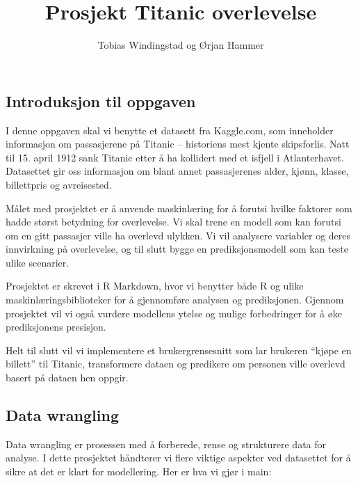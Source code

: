 \documentclass[
]{article}
\title{Prosjekt Titanic overlevelse}
\author{Tobias Windingstad og Ørjan Hammer}
\date{}
\begin{document}
\maketitle

\subsection{Introduksjon til oppgaven}\label{introduksjon-til-oppgaven}

I denne oppgaven skal vi benytte et datasett fra Kaggle.com, som
inneholder informasjon om passasjerene på Titanic -- historiens mest
kjente skipsforlis. Natt til 15. april 1912 sank Titanic etter å ha
kollidert med et isfjell i Atlanterhavet. Datasettet gir oss informasjon
om blant annet passasjerenes alder, kjønn, klasse, billettpris og
avreisested.

Målet med prosjektet er å anvende maskinlæring for å forutsi hvilke
faktorer som hadde størst betydning for overlevelse. Vi skal trene en
modell som kan forutsi om en gitt passasjer ville ha overlevd ulykken.
Vi vil analysere variabler og deres innvirkning på overlevelse, og til
slutt bygge en prediksjonsmodell som kan teste ulike scenarier.

Prosjektet er skrevet i R Markdown, hvor vi benytter både R og ulike
maskinlæringsbiblioteker for å gjennomføre analysen og prediksjonen.
Gjennom prosjektet vil vi også vurdere modellens ytelse og mulige
forbedringer for å øke prediksjonens presisjon.

Helt til slutt vil vi implementere et brukergrensesnitt som lar brukeren
``kjøpe en billett'' til Titanic, transformere dataen og predikere om
personen ville overlevd basert på dataen hen oppgir.

\subsection{Data wrangling}\label{data-wrangling}

Data wrangling er prosessen med å forberede, rense og strukturere data
for analyse. I dette prosjektet håndterer vi flere viktige aspekter ved
datasettet for å sikre at det er klart for modellering. Her er hva vi
gjør i main:
\end{document}

